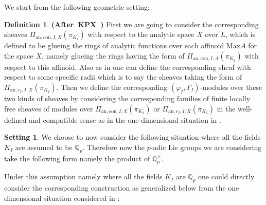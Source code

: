 \documentclass[12pt]{amsart}
\theoremstyle{definition}
\newtheorem{definition}[theorem]{Definition}
\numberwithin{equation}{section}
\newtheorem{setting}[theorem]{Setting}
\begin{document}
\indent We start from the following geometric setting:

\begin{definition} \mbox{\bf{(After KPX \cite[Definition 6.2.1]{KPX})}}
First we are going to consider the corresponding sheaves $\Pi_{\mathrm{an},\mathrm{con},I,X}(\pi_{K_I})$ with respect to the analytic space $X$ over $L$, which is defined to be glueing the rings of analytic functions over each affinoid $\mathrm{Max}A$ for the space $X$, namely glueing the rings having the form of $\Pi_{\mathrm{an},\mathrm{con},I,A}(\pi_{K_I})$ with respect to this affinoid. Also as in \cite[Definition 6.2.1]{KPX} one can define the corresponding sheaf with respect to some specific radii which is to say the sheaves taking the form of $\Pi_{\mathrm{an},r_{I},I,X}(\pi_{K_I})$. Then we define the corresponding $(\varphi_I,\Gamma_I)$-modules over these two kinds of sheaves by considering the corresponding families of finite locally free sheaves of modules over $\Pi_{\mathrm{an},\mathrm{con},I,X}(\pi_{K_I})$ or $\Pi_{\mathrm{an},r_{I},I,X}(\pi_{K_I})$ in the well-defined and compatible sense as in the one-dimensional situation in \cite[Definition 6.2.1]{KPX}.



\end{definition}















\begin{setting}
We choose to now consider the following situation where all the fields $K_I$ are assumed to be $\mathbb{Q}_p$. Therefore now the $p$-adic Lie groups we are considering take the following form namely the product of $\mathbb{Q}_p^\times$.	
\end{setting}


\indent Under this assumption namely where all the fields $K_I$ are $\mathbb{Q}_p$ one could directly consider the corresponding construction as generalized below from the one dimensional situation considered in \cite[Notation 6.2.2]{KPX}:
\end{document}
